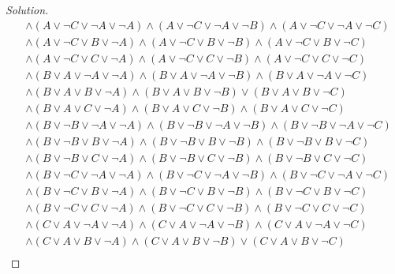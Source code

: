 \documentclass{article}
\newenvironment{solution}{\begin{proof}[\noindent\it Solution]}{\end{proof}}
\begin{document}
\begin{solution}
\begin{align*}
        & \land\left(A\lor\neg C\lor\neg A\lor\neg A\right)\land\left(A\lor\neg C\lor\neg A\lor\neg B\right)\land\left(A\lor\neg C\lor\neg A\lor\neg C\right) \\
        & \land\left(A\lor\neg C\lor B\lor\neg A\right)\land\left(A\lor\neg C\lor B\lor\neg B\right)\land\left(A\lor\neg C\lor B\lor\neg C\right) \\
        & \land\left(A\lor\neg C\lor C\lor\neg A\right)\land\left(A\lor\neg C\lor C\lor\neg B\right)\land\left(A\lor\neg C\lor C\lor\neg C\right) \\
        & \land\left(B\lor A\lor\neg A\lor\neg A\right)\land\left(B\lor A\lor\neg A\lor\neg B\right)\land\left(B\lor A\lor\neg A\lor\neg C\right) \\
        & \land\left(B\lor A\lor B\lor\neg A\right)\land\left(B\lor A\lor B\lor\neg B\right)
        \lor\left(B\lor A\lor B\lor\neg C\right) \\
        & \land\left(B\lor A\lor C\lor\neg A\right)\land\left(B\lor A\lor C\lor\neg B\right)\land\left(B\lor A\lor C\lor\neg C\right) \\
        & \land\left(B\lor\neg B\lor\neg A\lor\neg A\right)\land\left(B\lor\neg B\lor\neg A\lor\neg B\right)\land\left(B\lor\neg B\lor\neg A\lor\neg C\right) \\
        & \land\left(B\lor\neg B\lor B\lor\neg A\right)\land\left(B\lor\neg B\lor B\lor\neg B\right)\land\left(B\lor\neg B\lor B\lor\neg C\right) \\
        & \land\left(B\lor\neg B\lor C\lor\neg A\right)\land\left(B\lor\neg B\lor C\lor\neg B\right)\land\left(B\lor\neg B\lor C\lor\neg C\right) \\
        & \land\left(B\lor\neg C\lor\neg A\lor\neg A\right)\land\left(B\lor\neg C\lor\neg A\lor\neg B\right)\land\left(B\lor\neg C\lor\neg A\lor\neg C\right) \\
        & \land\left(B\lor\neg C\lor B\lor\neg A\right)\land\left(B\lor\neg C\lor B\lor\neg B\right)\land\left(B\lor\neg C\lor B\lor\neg C\right) \\
        & \land\left(B\lor\neg C\lor C\lor\neg A\right)\land\left(B\lor\neg C\lor C\lor\neg B\right)\land\left(B\lor\neg C\lor C\lor\neg C\right) \\
        & \land\left(C\lor A\lor\neg A\lor\neg A\right)\land\left(C\lor A\lor\neg A\lor\neg B\right)\land\left(C\lor A\lor\neg A\lor\neg C\right) \\
        & \land\left(C\lor A\lor B\lor\neg A\right)\land\left(C\lor A\lor B\lor\neg B\right)
        \lor\left(C\lor A\lor B\lor\neg C\right) \\

\end{align*}
\end{solution}
\end{document}

